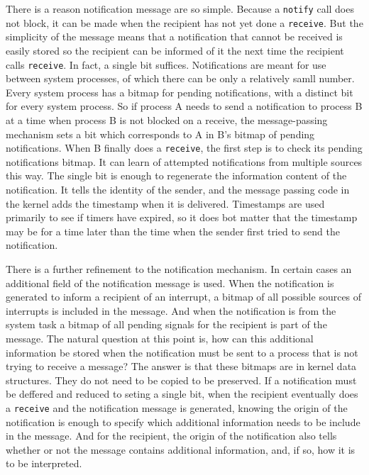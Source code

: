 \documentclass{book}
\newcommand {\cmd} [1] {\texttt{#1}}
\begin{document}
There is a reason notification message are so simple.
Because a \cmd{notify} call does not block, it can be made when the recipient has not yet done a \cmd{receive}.
But the simplicity of the message means that a notification that cannot be received is easily stored 
so the recipient can be informed of it the next time the recipient calls \cmd{receive}.
In fact, a single bit suffices.
Notifications are meant for use between system processes, of which there can be only a relatively samll number.
Every system process has a bitmap for pending notifications, with a distinct bit for every system process.
So if process A needs to send a notification to process B at a time when process B is not blocked on a receive,
the message-passing mechanism sets a bit which corresponds to A in B's bitmap of pending notifications.
When B finally does a \cmd{receive}, the first step is to check its pending notifications bitmap.
It can learn of attempted notifications from multiple sources this way.
The single bit is enough to regenerate the information content of the notification.
It tells the identity of the sender, and the message passing code in the kernel adds the timestamp when it is delivered.
Timestamps are used primarily to see if timers have expired, 
so it does bot matter that the timestamp may be for a time later than the time when the sender first tried to send the notification. 

There is a further refinement to the notification mechanism.
In certain cases an additional field of the notification message is used.
When the notification is generated to inform a recipient of an interrupt, 
a bitmap of all possible sources of interrupts is included in the message.
And when the notification is from the system task a bitmap of all pending signals for the recipient is part of the message.
The natural question at this point is, 
how can this additional information be stored when the notification must be sent to a process that is not trying to receive a message?
The answer is that these bitmaps are in kernel data structures.
They do not need to be copied to be preserved.
If a notification must be deffered and reduced to seting a single bit, 
when the recipient eventually does a \cmd{receive} and the notification message is generated, 
knowing the origin of the notification is enough to specify which additional information needs to be include in the message.
And for the recipient, the origin of the notification also tells whether or not the message contains additional information,
and, if so, how it is to be interpreted.
\end{document}
